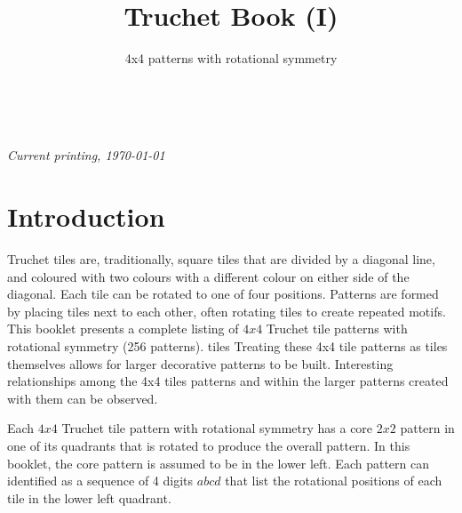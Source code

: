 \documentclass{tufte-book}
\title{Truchet Book (I)}
\subtitle{4x4 patterns with rotational symmetry}
\author[]{}
\begin{document}



\maketitle


\newpage
\begin{fullwidth}
~\vfill
\thispagestyle{empty}
\setlength{\parindent}{0pt}
\setlength{\parskip}{\baselineskip}



\par\textit{Current printing, \today}
\end{fullwidth}




\cleardoublepage



\chapter*{Introduction}

\noindent
Truchet tiles are, traditionally, square tiles that are divided by a diagonal line, and coloured with two colours with a different colour on either side of the diagonal. Each tile can be rotated to one of four positions. Patterns are formed by placing tiles next to each other, often rotating tiles to create repeated motifs.
This booklet presents a complete listing of $4x4$ Truchet tile patterns with rotational symmetry (256 patterns). tiles\marginnote{\centering} Treating these 4x4 tile patterns as tiles themselves allows for larger decorative patterns to be built. Interesting relationships among the 4x4 tiles patterns and within the larger patterns created with them can be observed. 

\vspace{0.5cm}
\noindent
Each $4x4$
Truchet tile pattern with rotational symmetry has a core $2x2$ pattern in one of its quadrants that is rotated to produce the overall pattern. \marginnote{\centering} In this booklet, the core pattern is assumed to be in the lower left. Each pattern can identified as a sequence of 4 digits $abcd$ that list the rotational positions of each tile in the lower left quadrant.
\end{document}
